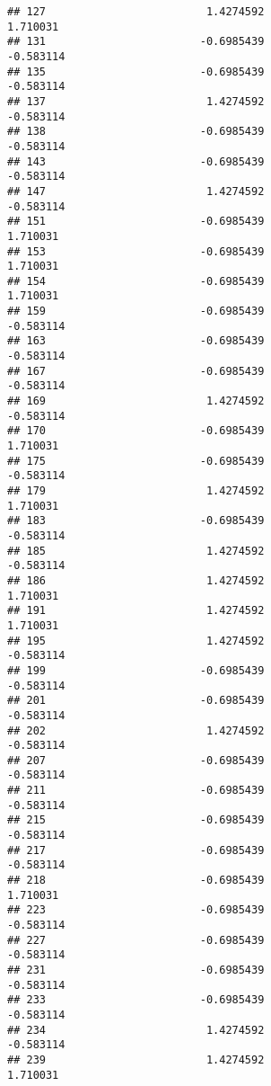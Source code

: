 \documentclass[
]{article}
\begin{document}
\begin{verbatim}
## 127                         1.4274592                         1.710031
## 131                        -0.6985439                        -0.583114
## 135                        -0.6985439                        -0.583114
## 137                         1.4274592                        -0.583114
## 138                        -0.6985439                        -0.583114
## 143                        -0.6985439                        -0.583114
## 147                         1.4274592                        -0.583114
## 151                        -0.6985439                         1.710031
## 153                        -0.6985439                         1.710031
## 154                        -0.6985439                         1.710031
## 159                        -0.6985439                        -0.583114
## 163                        -0.6985439                        -0.583114
## 167                        -0.6985439                        -0.583114
## 169                         1.4274592                        -0.583114
## 170                        -0.6985439                         1.710031
## 175                        -0.6985439                        -0.583114
## 179                         1.4274592                         1.710031
## 183                        -0.6985439                        -0.583114
## 185                         1.4274592                        -0.583114
## 186                         1.4274592                         1.710031
## 191                         1.4274592                         1.710031
## 195                         1.4274592                        -0.583114
## 199                        -0.6985439                        -0.583114
## 201                        -0.6985439                        -0.583114
## 202                         1.4274592                        -0.583114
## 207                        -0.6985439                        -0.583114
## 211                        -0.6985439                        -0.583114
## 215                        -0.6985439                        -0.583114
## 217                        -0.6985439                        -0.583114
## 218                        -0.6985439                         1.710031
## 223                        -0.6985439                        -0.583114
## 227                        -0.6985439                        -0.583114
## 231                        -0.6985439                        -0.583114
## 233                        -0.6985439                        -0.583114
## 234                         1.4274592                        -0.583114
## 239                         1.4274592                         1.710031

\end{verbatim}
\end{document}
